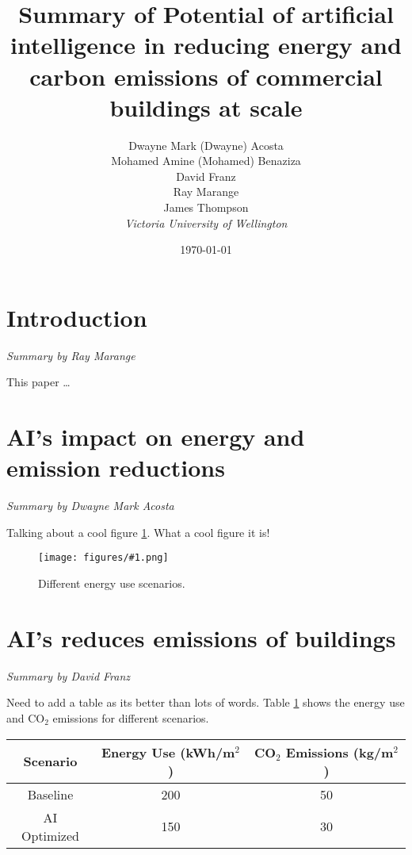 \documentclass[conference,a4paper]{IEEEtran}
\begin{document}
\newcommand{\cfigure}[2]{%
  \begin{figure}[h]
    \centering
    \texttt{[image: figures/\#1.png]}%
    \caption{#2}%
    \label{fig:#1}%
  \end{figure}%

}
\title{Summary of Potential of artificial intelligence in reducing energy and carbon emissions of commercial buildings at scale}

\author{Dwayne Mark (Dwayne) Acosta \\ Mohamed Amine (Mohamed) Benaziza \\ David Franz \\ Ray Marange \\ James Thompson\\
\textit{Victoria University of Wellington}\\}
\date{\today}

\maketitle

\section*{Introduction}
\textit{Summary by Ray Marange}

This paper \cite{dingPotentialArtificialIntelligence2024} \dots

\section*{AI's impact on energy and emission reductions}
\textit{Summary by Dwayne Mark Acosta}

Talking about a cool figure \ref{fig:cool-figure}. What a cool figure it is!

\cfigure{cool-figure}{Different energy use scenarios.}

\section*{AI's reduces emissions of buildings}
\textit{Summary by David Franz}

Need to add a table as its better than lots of words. Table \ref{tab:energy-emissions} shows the energy use and CO$_2$ emissions for different scenarios.

\begin{table}
\centering
\begin{tabular}{|c|c|c|}
\hline
\textbf{Scenario} & \textbf{Energy Use (kWh/m$^2$)} & \textbf{CO$_2$ Emissions (kg/m$^2$)} \\
\hline 
Baseline & 200 & 50 \\
\hline
AI Optimized & 150 & 30 \\
\hline
\end{tabular}
\label{tab:energy-emissions}
\end{table}
\end{document}
